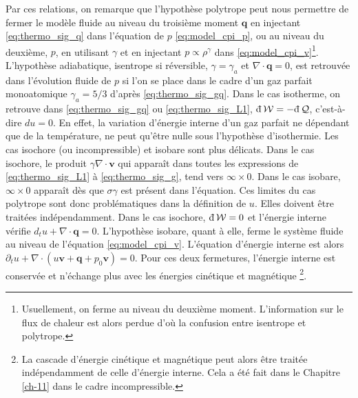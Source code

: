 Par ces relations, on remarque que l'hypothèse polytrope peut nous permettre de fermer le modèle fluide au niveau du troisième moment $\boldsymbol{q}$ en injectant \eqref{eq:thermo_sig_q} dans l'équation de $p$ \eqref{eq:model_cpi_p}, ou au niveau du deuxième, $p$, en utilisant $\gamma$ et en injectant $p \propto \rho^{\gamma}$ dans \eqref{eq:model_cpi_v}\footnote{Usuellement, on ferme au niveau du deuxième moment. L'information sur le flux de chaleur est alors perdue d'où la confusion entre isentrope et polytrope.}. L'hypothèse adiabatique, isentrope si réversible, $\gamma=\gamma_a$ et $\nabla \cdot \boldsymbol{q}=0$, est retrouvée dans l'évolution fluide de $p$ si l'on se place dans le cadre d'un gaz parfait monoatomique $\gamma_a = 5/3$ d'après \eqref{eq:thermo_sig_gq}. Dans le cas isotherme, on retrouve dans \eqref{eq:thermo_sig_gq} ou \eqref{eq:thermo_sig_L1}, $\dj \mathcal{W} = - \dj \mathcal{Q}$, c'est-à-dire $du = 0$. En effet, la variation d'énergie interne d'un gaz parfait ne dépendant que de la température, ne peut qu'être nulle sous l'hypothèse d'isothermie. Les cas isochore (ou incompressible) et isobare sont plus délicats. Dans le cas isochore, le produit $\gamma \nabla \cdot \boldsymbol{v}$ qui apparaît dans toutes les expressions de \eqref{eq:thermo_sig_L1} à \eqref{eq:thermo_sig_g}, tend vers $\infty \times 0$. Dans le cas isobare, $\infty \times 0$ apparaît dès que $\sigma \gamma$ est présent dans l'équation. Ces limites du cas polytrope sont donc problématiques dans la définition de $u$. Elles doivent être traitées indépendamment. Dans le cas isochore, $\dj \mathcal{W} = 0$ et l'énergie interne vérifie $d_t u + \nabla \cdot \boldsymbol{q} = 0 $. L'hypothèse isobare, quant à elle, ferme le système fluide au niveau de l'équation \eqref{eq:model_cpi_v}. L'équation d'énergie interne est alors  $\partial_t u + \nabla \cdot \left(u \boldsymbol{v} + \boldsymbol{q} + p_0 \boldsymbol{v}\right) = 0 $. Pour ces deux fermetures, l'énergie interne est conservée et n'échange plus avec les énergies cinétique et magnétique \footnote{La cascade d'énergie cinétique et magnétique peut alors être traitée indépendamment de celle d'énergie interne.  Cela a été fait dans le Chapitre \ref{ch-11} dans le cadre incompressible.}.

